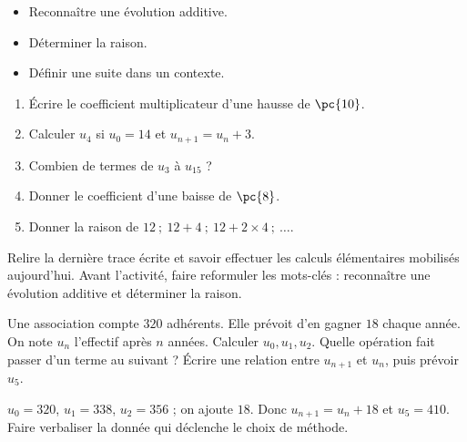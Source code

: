     \begin{objectives}\begin{itemize}\item Reconnaître une évolution additive.\item Déterminer la raison.\item Définir une suite dans un contexte.\end{itemize}\end{objectives}
    \begin{fluency}\begin{enumerate}\item Écrire le coefficient multiplicateur d'une hausse de $\pc{10}$. \item Calculer $u_4$ si $u_0=14$ et $u_{n+1}=u_n+3$. \item Combien de termes de $u_3$ à $u_{15}$ ? \item Donner le coefficient d'une baisse de $\pc{8}$. \item Donner la raison de $12\ ;\ 12+4\ ;\ 12+2\times4\ ;\ \ldots$. \end{enumerate}\end{fluency}
    \begin{prerequisites}Relire la dernière trace écrite et savoir effectuer les calculs élémentaires mobilisés aujourd'hui. Avant l'activité, faire reformuler les mots-clés : reconnaître une évolution additive et déterminer la raison.\end{prerequisites}

    \begin{activity}
    Une association compte $320$ adhérents. Elle prévoit d'en gagner $18$ chaque année. On note $u_n$ l'effectif après $n$ années. Calculer $u_0,u_1,u_2$. Quelle opération fait passer d'un terme au suivant ? Écrire une relation entre $u_{n+1}$ et $u_n$, puis prévoir $u_5$.
    \begin{center}\end{center}
    \end{activity}
    \begin{solution}$u_0=320$, $u_1=338$, $u_2=356$ ; on ajoute $18$. Donc $u_{n+1}=u_n+18$ et $u_5=410$. Faire verbaliser la donnée qui déclenche le choix de méthode.\end{solution}

